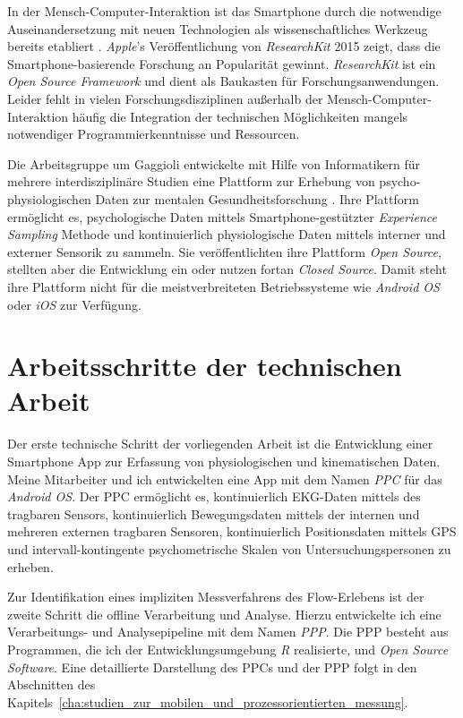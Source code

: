 In der Mensch-Computer-Interaktion ist das Smartphone durch die notwendige Auseinandersetzung mit neuen Technologien als wissenschaftliches Werkzeug bereits etabliert \citep{Froehlich2007}. \emph{Apple}'s Veröffentlichung von \emph{ResearchKit} 2015 zeigt, dass die Smartphone-basierende Forschung an Popularität gewinnt. \emph{ResearchKit} ist ein \emph{Open Source Framework} und dient als Baukasten für Forschungsanwendungen. Leider fehlt in vielen Forschungsdisziplinen außerhalb der Mensch-Computer-Interaktion häufig die Integration der technischen Möglichkeiten mangels notwendiger Programmierkenntnisse und Ressourcen.

Die Arbeitsgruppe um Gaggioli entwickelte mit Hilfe von Informatikern für mehrere interdisziplinäre Studien eine Plattform zur Erhebung von psycho-physiologischen Daten zur mentalen Gesundheitsforschung \citep{Gaggioli2013}. Ihre Plattform ermöglicht es, psychologische Daten mittels Smartphone-gestützter \emph{Experience Sampling} Methode und kontinuierlich physiologische Daten mittels interner und externer Sensorik zu sammeln. Sie veröffentlichten ihre Plattform \emph{Open Source}, stellten aber die Entwicklung ein oder nutzen fortan \emph{Closed Source}. Damit steht ihre Plattform nicht für die meistverbreiteten Betriebssysteme wie \emph{Android OS} oder \emph{iOS} zur Verfügung.

\section{Arbeitsschritte der technischen Arbeit}
\label{sec:arbeitsschritte-der-technischen-arbeit}
Der erste technische Schritt der vorliegenden Arbeit ist die Entwicklung einer Smartphone App zur Erfassung von physiologischen und kinematischen Daten. Meine Mitarbeiter und ich entwickelten eine App mit dem Namen \emph{\ac{PPC}} für das \emph{Android OS}. Der \ac{PPC} ermöglicht es, kontinuierlich \ac{EKG}-Daten mittels des tragbaren Sensors, kontinuierlich Bewegungsdaten mittels der internen und mehreren externen tragbaren Sensoren, kontinuierlich Positionsdaten mittels \ac{GPS} und intervall-kontingente psychometrische Skalen von Untersuchungspersonen zu erheben.

Zur Identifikation eines impliziten Messverfahrens des Flow-Erlebens ist der zweite Schritt die offline Verarbeitung und Analyse. Hierzu entwickelte ich eine Verarbeitungs- und Analysepipeline mit dem Namen \emph{\ac{PPP}}. Die \ac{PPP} besteht aus Programmen, die ich der Entwicklungsumgebung \emph{R} realisierte, und \emph{Open Source Software}. Eine detaillierte Darstellung des \ac{PPC}s und der \ac{PPP} folgt in den Abschnitten des Kapitels~\ref{cha:studien_zur_mobilen_und_prozessorientierten_messung}.

